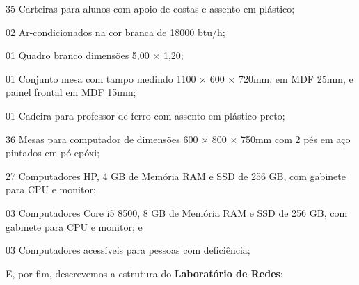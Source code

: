\documentclass[
	12pt,				%
	openright,			%
	twoside,			%
	a4paper,			%
	chapter=TITLE,		%
	english,			%
	french,				%
	spanish,			%
	brazil,				%
	]{abntex2}
\begin{document}
\begin{alineas}
\item  35 Carteiras para alunos com apoio de costas e assento em plástico;
\item 02 Ar-condicionados na cor branca de 18000 btu/h;
\item 01 Quadro branco dimensões 5,00 $\times$ 1,20;
	\item 01 Conjunto mesa com tampo medindo 1100  $\times$ 600  $\times$ 720mm, em MDF 25mm, e painel frontal em MDF 15mm;
	\item 01 Cadeira para professor de ferro com assento em plástico preto;
\item 36 Mesas para computador de dimensões 600  $\times$ 800  $\times$ 750mm com 2 pés em aço pintados em pó epóxi;
\item 27 Computadores HP, 4 GB de Memória RAM e SSD de 256 GB, com
gabinete para CPU e monitor;
\item 03 Computadores Core i5 8500, 8 GB de Memória RAM e SSD de 256 GB,
com gabinete para CPU e monitor; e
\item  03 Computadores acessíveis para pessoas com deficiência;
\end{alineas}

E, por fim, descrevemos a estrutura do \textbf{Laboratório de Redes}:
\end{document}
